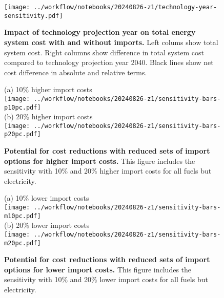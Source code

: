 \begin{figure}[!htb]
    \texttt{[image: ../workflow/notebooks/20240826-z1/technology-year-sensitivity.pdf]} \\
    \caption{\textbf{Impact of technology projection year on total energy system
    cost with and without imports.} Left colums show total system cost.
    Right columns show difference in total system cost compared to technology
    projection year 2040. Black lines show net cost difference in absolute and
    relative terms.}
    \label{fig:si:technology-projection}
\end{figure}

\begin{figure}[!htb]
    \footnotesize
    (a) 10\% higher import costs \\
    \texttt{[image: ../workflow/notebooks/20240826-z1/sensitivity-bars-p10pc.pdf]} \\
    (b) 20\% higher import costs \\
    \texttt{[image: ../workflow/notebooks/20240826-z1/sensitivity-bars-p20pc.pdf]} \\
    \caption{\textbf{Potential for cost reductions with reduced sets of import
    options for higher import costs.} This figure includes the sensitivity with
    10\% and 20\% higher import costs for all fuels but electricity.}
    \label{fig:si:subsets-higher}
\end{figure}




\begin{figure}[!htb]
    \footnotesize
    (a) 10\% lower import costs \\
    \texttt{[image: ../workflow/notebooks/20240826-z1/sensitivity-bars-m10pc.pdf]} \\
    (b) 20\% lower import costs \\
    \texttt{[image: ../workflow/notebooks/20240826-z1/sensitivity-bars-m20pc.pdf]} \\
    \caption{\textbf{Potential for cost reductions with reduced sets of import options for lower import costs.} This figure includes the sensitivity with
    10\% and 20\% lower import costs for all fuels but electricity.}
    \label{fig:si:subsets-lower}
\end{figure}

